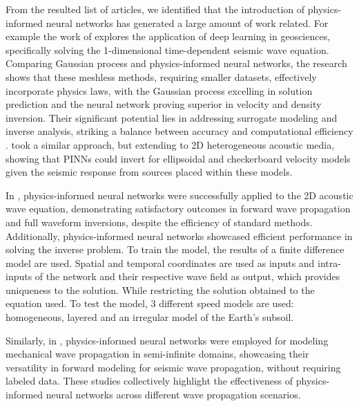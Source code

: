 \documentclass[11pt,twoside]{article}
\begin{document}
From the resulted list of articles, we identified that the introduction of physics-informed neural 
networks has generated a large amount of work related. For example the work of 
 explores the application of deep learning in geosciences, 
specifically solving the 1-dimensional time-dependent seismic wave equation. Comparing Gaussian process 
and physics-informed neural networks, the research shows that these meshless methods, requiring 
smaller datasets, effectively incorporate physics laws, with the Gaussian process excelling in 
solution prediction and the neural network proving superior in velocity and density inversion. 
Their significant potential lies in addressing surrogate modeling and inverse analysis, 
striking a balance between accuracy and computational efficiency \citep{Song2022}. 
 took a similar  approach, but extending to 2D heterogeneous acoustic 
media, showing that PINNs could invert for ellipsoidal and checkerboard velocity models 
given the seismic response from sources placed within these models.

In , physics-informed neural networks were successfully 
applied to the 2D acoustic wave equation, demonstrating satisfactory outcomes in forward wave propagation and 
full waveform inversions, despite the efficiency of standard methods. Additionally, physics-informed neural networks 
showcased efficient performance in solving the inverse problem. To train the model, the results of a finite difference 
model are used. Spatial and temporal coordinates are used as inputs and intra-inputs of the network and their respective 
wave field as output, which provides uniqueness to the solution. While restricting the solution obtained to the equation 
used. To test the model, 3 different speed models are used: homogeneous, layered and an irregular model of the Earth's subsoil.

Similarly, in , physics-informed neural networks were employed for modeling 
mechanical wave propagation in semi-infinite domains, showcasing their versatility in forward modeling for seismic 
wave propagation, without requiring labeled data. These studies collectively highlight the effectiveness of physics-informed 
neural networks across different wave propagation scenarios.

\end{document}
